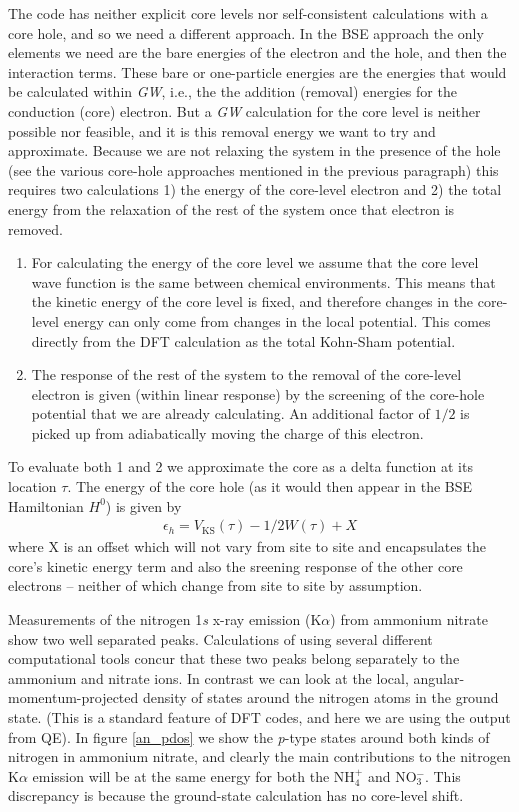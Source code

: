 \documentclass[11pt]{report}
\begin{document}
The  code has neither explicit core levels nor self-consistent calculations with a core hole, and so we need a different approach. In the BSE approach the only elements we need are the bare energies of the electron and the hole, and then the interaction terms. These bare or one-particle energies are the energies that would be calculated within {\it GW}, i.e., the the addition (removal) energies for the conduction (core) electron. But a {\it GW} calculation for the core level is neither possible nor feasible, and it is this removal energy we want to try and approximate. Because we are not relaxing the system in the presence of the hole (see the various core-hole approaches mentioned in the previous paragraph) this requires two calculations 1) the energy of the core-level electron and 2) the total energy from the relaxation of the rest of the system once that electron is removed. 

\begin{enumerate}
\item
For calculating the energy of the core level we assume that the core level wave function is the same between chemical environments. This means that the kinetic energy of the core level is fixed, and therefore changes in the core-level energy can only come from changes in the local potential. This comes directly from the DFT calculation as the total Kohn-Sham potential.
\item The response of the rest of the system to the removal of the core-level electron is given (within linear response) by the screening of the core-hole potential that we are already calculating. An additional factor of $1/2$ is picked up from adiabatically moving the charge of this electron. 
\end{enumerate}
To evaluate both 1 and 2 we approximate the core as a delta function at its location $\tau$. 
The energy of the core hole (as it would then appear in the BSE Hamiltonian $H^0$) is given by
\begin{align}
\epsilon_h = V_\text{KS}(\tau) - 1/2 W(\tau) + X
\end{align}
where X is an offset which will not vary from site to site and encapsulates the core's kinetic energy term and also the sreening response of the other core electrons -- neither of which change from site to site by assumption.

Measurements of the nitrogen 1{\it s} x-ray emission (K$\alpha$) from ammonium nitrate show two well separated peaks. Calculations of using several different computational tools concur that these two peaks belong separately to the ammonium and nitrate ions.\cite{ANpapers} 
In contrast we can look at the local, angular-momentum-projected density of states around the nitrogen atoms in the ground state. (This is a standard feature of DFT codes, and here we are using the output from QE). In figure \ref{an_pdos} we show the {\it p}-type states around both kinds of nitrogen in ammonium nitrate, and clearly the main contributions to the nitrogen K$\alpha$ emission will be at the same energy for both the NH$_4^+$ and NO$_3^-$. This discrepancy is because the ground-state calculation has no core-level shift.
\end{document}
